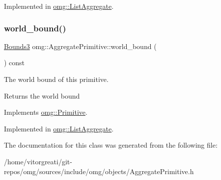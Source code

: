 Implemented in \mbox{\hyperlink{classomg_1_1_list_aggregate_ac3abd78ca5ce87eb3821bf19bf5194cf}{omg\+::\+List\+Aggregate}}.

\mbox{\label{classomg_1_1_aggregate_primitive_ad8a385aaa01354acffad18fe8f23fa25}} 
\subsubsection{\texorpdfstring{world\_bound()}{world\_bound()}}
{\footnotesize\ttfamily \mbox{\hyperlink{classomg_1_1_bounds3}{Bounds3}} omg\+::\+Aggregate\+Primitive\+::world\+\_\+bound (\begin{DoxyParamCaption}{ }\end{DoxyParamCaption}) const\hspace{0.3cm}{\ttfamily [pure virtual]}}



The world bound of this primitive. 

\begin{DoxyReturn}{Returns}
the world bound 
\end{DoxyReturn}


Implements \mbox{\hyperlink{classomg_1_1_primitive_a457b29547bc918cf8874b24f5168ff86}{omg\+::\+Primitive}}.



Implemented in \mbox{\hyperlink{classomg_1_1_list_aggregate_a8c7b3a6c7c8a087355a1a35519c79555}{omg\+::\+List\+Aggregate}}.



The documentation for this class was generated from the following file\+:\begin{DoxyCompactItemize}
\item 
/home/vitorgreati/git-\/repos/omg/sources/include/omg/objects/Aggregate\+Primitive.\+h\end{DoxyCompactItemize}
